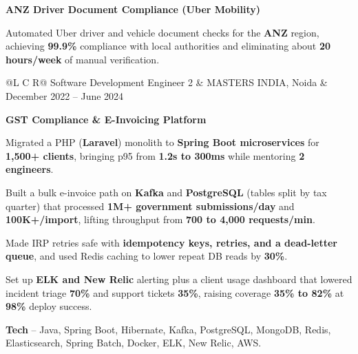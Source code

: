 \textcolor{Project}{\textbf{ANZ Driver Document Compliance (Uber Mobility)}}
\vspace{-1ex}
\begin{zitemize}
    \item Automated Uber driver and vehicle document checks for the \textbf{ANZ} region, achieving \textbf{99.9\%} compliance with local authorities and eliminating about \textbf{20 hours/week} of manual verification.
\end{zitemize}

\vspace{0.1ex}
\noindent
\begin{tabularx}{\textwidth}{@{}L C R@{}}
\textcolor{role}{Software Development Engineer 2} & \textcolor{company}{MASTERS INDIA, Noida} & \textcolor{date}{December 2022 -- June 2024}\\
\end{tabularx}
\vspace{-2.2ex}

\textcolor{Project}{\textbf{GST Compliance \& E-Invoicing Platform}}
\vspace{-1ex}
\begin{zitemize}
    \item Migrated a PHP (\textbf{Laravel}) monolith to \textbf{Spring Boot microservices} for \textbf{1,500+ clients}, bringing p95 from \textbf{1.2s to 300ms} while mentoring \textbf{2 engineers}.
    \item Built a bulk e-invoice path on \textbf{Kafka} and \textbf{PostgreSQL} (tables split by tax quarter) that processed \textbf{1M+ government submissions/day} and \textbf{100K+/import}, lifting throughput from \textbf{700 to 4,000 requests/min}.
    \item Made IRP retries safe with \textbf{idempotency keys, retries, and a dead-letter queue}, and used Redis caching to lower repeat DB reads by \textbf{30\%}.
    \item Set up \textbf{ELK and New Relic} alerting plus a client usage dashboard that lowered incident triage \textbf{70\%} and support tickets \textbf{35\%}, raising coverage \textbf{35\% to 82\%} at \textbf{98\%} deploy success.
    \item \textbf{Tech} -- Java, Spring Boot, Hibernate, Kafka, PostgreSQL, MongoDB, Redis, Elasticsearch, Spring Batch, Docker, ELK, New Relic, AWS.
\end{zitemize}

